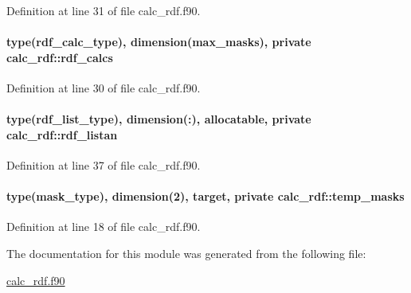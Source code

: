 Definition at line 31 of file calc\-\_\-rdf.\-f90.

\hypertarget{classcalc__rdf_a2ac9ffc28669485012624afbd8dd0496}{
\paragraph[{rdf\-\_\-calcs}]{\setlength{\rightskip}{0pt plus 5cm}type({\bf rdf\-\_\-calc\-\_\-type}), dimension({\bf max\-\_\-masks}), private calc\-\_\-rdf\-::rdf\-\_\-calcs\hspace{0.3cm}{\ttfamily [private]}}}\label{classcalc__rdf_a2ac9ffc28669485012624afbd8dd0496}


Definition at line 30 of file calc\-\_\-rdf.\-f90.

\hypertarget{classcalc__rdf_a4866e206ec5a6ba96173ad1114bbbf1b}{
\paragraph[{rdf\-\_\-listan}]{\setlength{\rightskip}{0pt plus 5cm}type({\bf rdf\-\_\-list\-\_\-type}), dimension(\-:), allocatable, private calc\-\_\-rdf\-::rdf\-\_\-listan\hspace{0.3cm}{\ttfamily [private]}}}\label{classcalc__rdf_a4866e206ec5a6ba96173ad1114bbbf1b}


Definition at line 37 of file calc\-\_\-rdf.\-f90.

\hypertarget{classcalc__rdf_ad788295fc7aa75a983eaabd76619fd27}{
\paragraph[{temp\-\_\-masks}]{\setlength{\rightskip}{0pt plus 5cm}type(mask\-\_\-type), dimension(2), target, private calc\-\_\-rdf\-::temp\-\_\-masks\hspace{0.3cm}{\ttfamily [private]}}}\label{classcalc__rdf_ad788295fc7aa75a983eaabd76619fd27}


Definition at line 18 of file calc\-\_\-rdf.\-f90.



The documentation for this module was generated from the following file\-:\begin{DoxyCompactItemize}
\item 
\hyperlink{calc__rdf_8f90}{calc\-\_\-rdf.\-f90}\end{DoxyCompactItemize}

